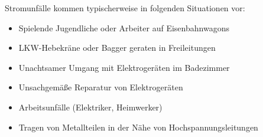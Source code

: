 Stromunfälle kommen typischerweise in folgenden Situationen vor:
\begin{itemize}
  \item Spielende Jugendliche oder Arbeiter auf Eisenbahnwagons
  \item LKW-Hebekräne oder Bagger geraten in Freileitungen
  \item Unachtsamer Umgang mit Elektrogeräten im Badezimmer
  \item Unsachgemäße Reparatur von Elektrogeräten
  \item Arbeitsunfälle (Elektriker, Heimwerker)
  \item Tragen von  Metallteilen in der Nähe von Hochspannungsleitungen
\end{itemize}



